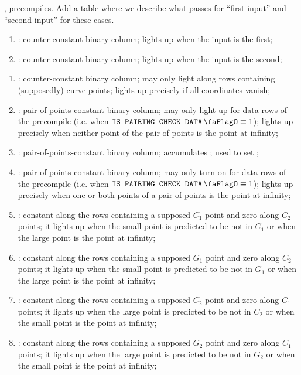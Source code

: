 ,
precompiles.
\specTodo{} Add a table where we describe what passes for ``first input'' and ``second input'' for these cases.
\begin{enumerate}[resume]
    \item
        \isFirstInput:
        counter-constant binary column;
        lights up when the input is the first;
    \item
        \isSecondInput:
        counter-constant binary column;
        lights up when the input is the second;
\end{enumerate}
\begin{enumerate}[resume]
    \item
        \isInfinity:
        counter-constant binary column;
        may only light along rows containing (supposedly) curve points;
        lights up precisely if all coordinates vanish;
    \item
        \nontrivialPairOfPointsBit:
        pair-of-points-constant binary column;
        may only light up for data rows of the  precompile (i.e. when $\isBlsPairingCheckData \equiv 1$);
        lights up precisely when neither point of the pair of points is the point at infinity;
    \item
        \nontrivialPairOfPointsAcc:
        pair-of-points-constant binary column;
        accumulates \nontrivialPairOfPointsBit{};
        used to set \wellformedDataNontrivial{};
    \item
        \specTodo{}
        \deprecated{}
        \both{\nontrivialPairOfPointsBit}:
        pair-of-points-constant binary column;
        may only turn on for data rows of the  precompile (i.e. when $\isBlsPairingCheckData \equiv 1$);
        lights up precisely when one or both points of a pair of points is the point at infinity;
    \item
        \both{\cOneMembershipTestRequired}:
        constant along the rows containing a supposed $C_1$ point and zero along $C_2$ points;
        it lights up when the small point is predicted to be not in $C_1$ or when the large point is the point at infinity;
    \item
        \both{\gOneMembershipTestRequired}:
        constant along the rows containing a supposed $G_1$ point and zero along $C_2$ points;
        it lights up when the small point is predicted to be not in $G_1$ or when the large point is the point at infinity;
    \item
        \both{\cTwoMembershipTestRequired}:
        constant along the rows containing a supposed $C_2$ point and zero along $C_1$ points;
        it lights up when the large point is predicted to be not in $C_2$ or when the small point is the point at infinity;
    \item
        \both{\gTwoMembershipTestRequired}:
        constant along the rows containing a supposed $G_2$ point and zero along $C_1$ points;
        it lights up when the large point is predicted to be not in $G_2$ or when the small point is the point at infinity;
\end{enumerate}
